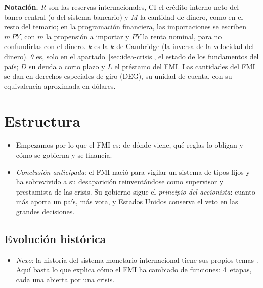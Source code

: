 \documentclass[11pt]{article}
\begin{document}
\begin{anotaciones}
\textbf{Notación.} $R$ son las reservas internacionales, $\mathrm{CI}$ el crédito interno neto del banco central (o del sistema bancario) y $M$ la cantidad de dinero, como en el resto del temario; en la programación financiera, las importaciones se escriben $m\,PY$, con $m$ la propensión a importar y $PY$ la renta nominal, para no confundirlas con el dinero. $k$ es la $k$ de Cambridge (la inversa de la velocidad del dinero). $\theta$ es, solo en el apartado~\ref{sec:idea-crisis}, el estado de los fundamentos del país; $D$ su deuda a corto plazo y $L$ el préstamo del FMI. Las cantidades del FMI se dan en derechos especiales de giro (DEG), su unidad de cuenta, con su equivalencia aproximada en dólares.
\end{anotaciones}

\section{Estructura}\label{sec:estructura}

\begin{itemize}
\item Empezamos por lo que el FMI es: de dónde viene, qué reglas lo obligan y cómo se gobierna y se financia.
\item \emph{Conclusión anticipada}: el FMI nació para vigilar un sistema de tipos fijos y ha sobrevivido a su desaparición reinventándose como supervisor y prestamista de las crisis. Su gobierno sigue el \emph{principio del accionista}: cuanto más aporta un país, más vota, y Estados Unidos conserva el veto en las grandes decisiones.
\end{itemize}

\subsection{Evolución histórica}\label{sec:historia}

\begin{itemize}
\item \emph{Nexo}: la historia del sistema monetario internacional tiene sus propios temas  . Aquí basta lo que explica cómo el FMI ha cambiado de funciones: 4~etapas, cada una abierta por una crisis.
\end{itemize}
\end{document}
